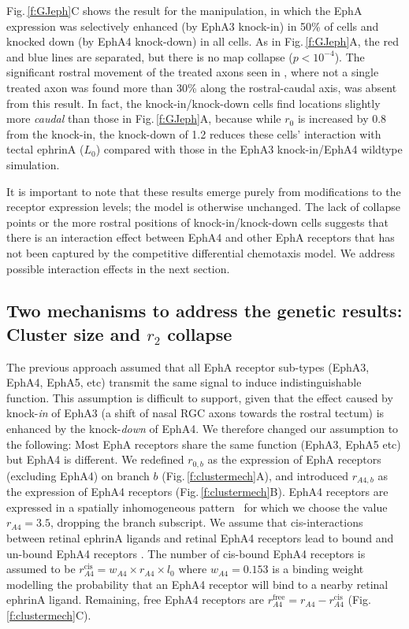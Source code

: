 \documentclass[9pt,lineno,draft]{elife}
\begin{document}
Fig.\,\ref{f:GJeph}C shows the result for the \citet{reber_relative_2004} manipulation, in which the EphA expression was selectively enhanced (by EphA3 knock-in) in 50\% of cells and knocked down (by EphA4 knock-down) in all cells.
As in Fig.\,\ref{f:GJeph}A, the red and blue lines are separated, but there is no map collapse ($p<10^{-4}$).
The significant rostral movement of the treated axons seen in \citet{reber_relative_2004}, where not a single treated axon was found more than 30\% along the rostral-caudal axis, was absent from this result.
In fact, the knock-in/knock-down cells find locations slightly more \emph{caudal} than those in Fig.\,\ref{f:GJeph}A, because while $r_0$ is increased by 0.8 from the knock-in, the knock-down of 1.2 reduces these cells' interaction with tectal ephrinA ($L_0$) compared with those in the EphA3 knock-in/EphA4 wildtype simulation.

It is important to note that these results emerge purely from modifications to the receptor expression levels; the model is otherwise unchanged.
The lack of collapse points or the more rostral positions of knock-in/knock-down cells suggests that there is an interaction effect between EphA4 and other EphA receptors that has not been captured by the competitive differential chemotaxis model.
We address possible interaction effects in the next section.

\subsection*{Two mechanisms to address the genetic results: Cluster size and $r_2$ collapse}

The previous approach assumed that all EphA receptor sub-types (EphA3, EphA4, EphA5, etc) transmit the same signal to induce indistinguishable function.
This assumption is difficult to support, given that the effect caused by knock-\emph{in} of EphA3 (a shift of nasal RGC axons towards the rostral tectum) is enhanced by the knock-\emph{down} of EphA4.
We therefore changed our assumption to the following: Most EphA receptors share the same function (EphA3, EphA5 etc) but EphA4 is different.
We redefined $r_{\!\scriptscriptstyle 0,b}$ as the expression of EphA receptors (excluding EphA4) on branch $b$ (Fig.\,\ref{f:clustermech}A), and introduced $r_{\!\scriptscriptstyle A4,b}$ as the expression of EphA4 receptors (Fig.\,\ref{f:clustermech}B). EphA4 receptors are expressed in a spatially inhomogeneous pattern~\citep{reber_relative_2004} for which we choose the value $r_{\!\scriptscriptstyle A4} = 3.5$, dropping the branch subscript.  We assume that cis-interactions between retinal ephrinA ligands and retinal EphA4 receptors lead to bound and un-bound EphA4 receptors \citep{hornberger_modulation_1999}. The number of cis-bound EphA4 receptors is assumed to be $r_{\!\scriptscriptstyle A4}^{\mathrm{cis}} = w_{\!\scriptscriptstyle A4} \times r_{\!\scriptscriptstyle A4} \times l_0$ where $w_{\!\scriptscriptstyle A4} = 0.153$ is a binding weight modelling the probability that an EphA4 receptor will bind to a nearby retinal ephrinA ligand. Remaining, free EphA4 receptors are $r_{\!\scriptscriptstyle A4}^{\mathrm{free}} = r_{\!\scriptscriptstyle A4} - r_{\!\scriptscriptstyle A4}^{\mathrm{cis}}$ (Fig.\,\ref{f:clustermech}C).
\end{document}
